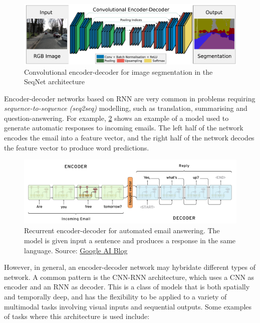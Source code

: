 \begin{figure}[hpt]
	\centering
	\includegraphics[scale=0.45]{images/ch3/cnn-cnn.png}
	\caption{Convolutional encoder-decoder for image segmentation in the SeqNet architecture \citep{Badrinarayanan2017}}
	\label{fig:cnn-cnn}
\end{figure}

Encoder-decoder networks based on RNN are very common in problems requiring \textit{sequence-to-sequence (seq2seq)} modelling, such as translation, summarising and question-answering. For example, \cref{fig:rnn-rnn} shows an example of a model used to generate automatic responses to incoming emails. The left half of the network encodes the email into a feature vector, and the right half of the network decodes the feature vector to produce word predictions. 

\begin{figure}[hpt]
	\centering
	\includegraphics[scale=0.3]{images/ch3/rnn-rnn.png}
	\caption{Recurrent encoder-decoder for automated email answering. The model is given input a sentence and produces a response in the same language. Source: \href{https://ai.googleblog.com/2015/11/computer-respond-to-this-email.html}{Google AI Blog}}
	\label{fig:rnn-rnn}
\end{figure}

However, in general, an encoder-decoder network may hybridate different types of network. A common pattern is the CNN-RNN architecture, which uses a CNN as encoder and an RNN as decoder. This is a class of models that is both spatially and temporally deep, and has the flexibility to be applied to a variety of multimodal tasks involving visual inputs and sequential outputs. Some examples of tasks where this architecture is used include:

